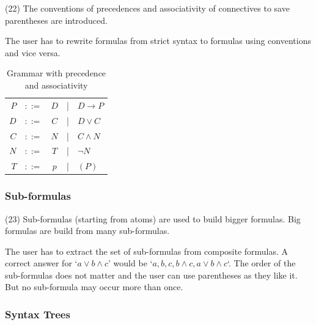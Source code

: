 (22) The conventions of precedences and associativity  of connectives to save parentheses are introduced. 

The user has to rewrite formulas from strict syntax to formulas using conventions and vice versa.

\begin{table}[htdp]
\begin{center}
\begin{tabular}{rcccl}
$P$		&$::=$ & $D$ &|& $D \rightarrow P$\\
$D$		&$::=$ & $C$ &|& $D \vee C$			\\
$C$		&$::=$ & $N$ &|& $C \wedge N$ 		\\
$N$		&$::=$ & $T$ &|& $\neg N$ 			\\
$T$		&$::=$ & $p$ &|& $(P)$
\end{tabular}
\caption{Grammar with precedence and associativity}
\label{tab:BNFGRPR}
\end{center}
\end{table}


\subsubsection{Sub-formulas}
\label{tut:23}

(23) Sub-formulas (starting from atoms) are used to build bigger formulas. Big formulas are build from many sub-formulas.

The user has to extract the set of sub-formulas from composite formulas. 
A correct answer for 
‘$a \vee b \wedge c$’ would be
‘$a,b,c,b\wedge c, a \vee b \wedge c$‘. 
The order of the sub-formulas does not matter and the user can use parentheses as they like it.
But no sub-formula may occur more than once.

\subsubsection{Syntax Trees}
\label{tut:24}

